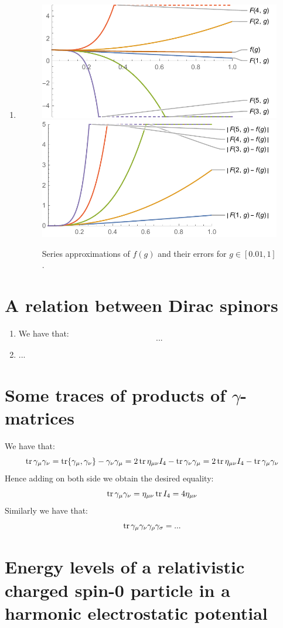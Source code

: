 \documentclass[10pt,a4paper]{article}
\begin{document}
\begin{enumerate}
\item \begin{figure}
\centering
\includegraphics[width=0.44 \textwidth]{approx_series}
\hspace{0.1\textwidth}
\includegraphics[width=0.44 \textwidth]{error_series}
\caption{Series approximations of $f(g)$ and their errors for $g \in [0.01, 1]$.}
\end{figure}

\end{enumerate}


\section{A relation between Dirac spinors}

\begin{enumerate}

\item We have that:
\[
...
\]

\item ...


\end{enumerate}


\section{Some traces of products of $\gamma$-matrices}

We have that:
\[
\tr \gamma_\mu \gamma_\nu = \tr {\gamma_\mu, \gamma_\nu} - \gamma_\nu \gamma_\mu = 2 \tr \eta_{\mu \nu} I_4 - \tr \gamma_\nu \gamma_\mu = 2 \tr \eta_{\mu \nu} I_4 - \tr \gamma_\mu \gamma_\nu
\]
Hence adding on both side we obtain the desired equality:
\[
\tr \gamma_\mu \gamma_\nu = \eta_{\mu \nu} \tr I_4 = 4 \eta_{\mu \nu}
\]
Similarly we have that:
\[
\tr \gamma_\mu \gamma_\nu \gamma_\rho \gamma_\sigma = ... 
\]

\section{Energy levels of a relativistic charged spin-0 particle in a harmonic electrostatic potential}
\end{document}

